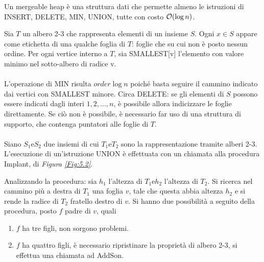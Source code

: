 \documentclass{subfiles}
\begin{document}
Un mergeable heap è una struttura dati che permette almeno le istruzioni di INSERT, DELETE, MIN, UNION, tutte con costo \(\order{\log n}\).

\noindent Sia \(T\) un albero 2-3 che rappresenta elementi di un insieme \(S\). Ogni \(x \in S\) appare come etichetta di una qualche foglia di \(T\):
foglie che su cui non è posto nessun ordine. Per ogni vertice interno a \(T\), sia SMALLEST[v] l'elemento con valore minimo nel sotto-albero di radice v.
\\ \\
L'operazione di MIN risulta \(order{\log n}\) poiché basta seguire il cammino indicato dai vertici con SMALLEST minore.
Circa DELETE: se gli elementi di \(S\) possono essere indicati dagli interi \(1, 2, \ldots, n\), è possibile allora indicizzare le foglie direttamente.
Se ciò non è possibile, è necessario far uso di una struttura di supporto, che contenga puntatori alle foglie di \(T\).
\\ \\
Siano \(S_{1} \text{e} S_{2}\) due insiemi di cui \(T_{1} \text{e} T_{2}\) sono la rappresentazione tramite alberi 2-3.
L'esecuzione di un'istruzione UNION è effettuata con un chiamata alla procedura Implant, di \emph{Figura \ref{Fig:5.2}}.



\noindent Analizzando la procedura: sia \(h_{1}\) l'altezza di \(T_{1} \text{e} h_{2}\) l'altezza di \(T_{2}\).
Si ricerca nel cammino più a destra di \(T_{1}\) una foglia \(v\), tale che questa abbia altezza \(h_{2}\) e si rende la radice di \(T_{2}\) fratello destro di \(v\).
Si hanno due possibilità a seguito della procedura, posto \(f\) padre di \(v\), quali
\begin{enumerate}
    \item \(f\) ha tre figli, non sorgono problemi.
    \item \(f\) ha quattro figli, è necessario ripristinare la proprietà di albero 2-3, si effettua una chiamata ad AddSon.
\end{enumerate}
\end{document}
